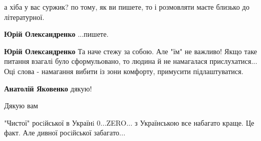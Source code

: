 \begin{itemize}
а хіба у вас суржик? по тому, як ви пишете, то і розмовляти маєте близько до літературної.

\begin{itemize}
 
\textbf{Юрій Олександренко} ...пишете.

 
\textbf{Юрій Олександренко} Та наче стежу за собою. Але "їм" не важливо! Якщо таке питання взагалі було сформульовано, то людина й не намагалася прислухатися... Оці слова - намагання вибити із зони комфорту, примусити підлаштуватися.

 
\textbf{Анатолій Яковенко} дякую!
\end{itemize}

 
Дякую вам

 
"Чистої" росiйської в Українi 0...ZERO... з Українською все набагато краще. Це факт. Але дивної росiйської забагато...

 

\end{itemize}
